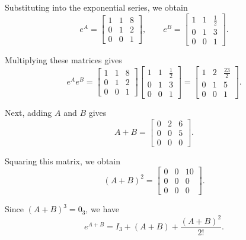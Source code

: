 \documentclass{article}
\begin{document}
\begin{enumerate}
        Substituting into the exponential series,
        we obtain
        \[
          e^A=
          \begin{bmatrix}
            1 & 1 & 8 \\
            0 & 1 & 2 \\
            0 & 0 & 1
          \end{bmatrix},
          \qquad
          e^B=
          \begin{bmatrix}
            1 & 1 & \frac12 \\
            0 & 1 & 3       \\
            0 & 0 & 1
          \end{bmatrix}.
        \]

        Multiplying these matrices gives
        \[
          e^Ae^B=
          \begin{bmatrix}
            1 & 1 & 8 \\
            0 & 1 & 2 \\
            0 & 0 & 1
          \end{bmatrix}
          \begin{bmatrix}
            1 & 1 & \frac12 \\
            0 & 1 & 3       \\
            0 & 0 & 1
          \end{bmatrix}
          =
          \begin{bmatrix}
            1 & 2 & \frac{23}{2} \\
            0 & 1 & 5            \\
            0 & 0 & 1
          \end{bmatrix}.
        \]

        Next, adding $A$ and $B$ gives
        \[
          A+B=
          \begin{bmatrix}
            0 & 2 & 6 \\
            0 & 0 & 5 \\
            0 & 0 & 0
          \end{bmatrix}.
        \]

        Squaring this matrix, we obtain
        \[
          (A+B)^2=
          \begin{bmatrix}
            0 & 0 & 10 \\
            0 & 0 & 0  \\
            0 & 0 & 0
          \end{bmatrix}.
        \]

        Since $(A+B)^3=0_3$, we have
        \[
          e^{A+B}=I_3+(A+B)+\frac{(A+B)^2}{2!}.
        \]


\end{enumerate}
\end{document}
